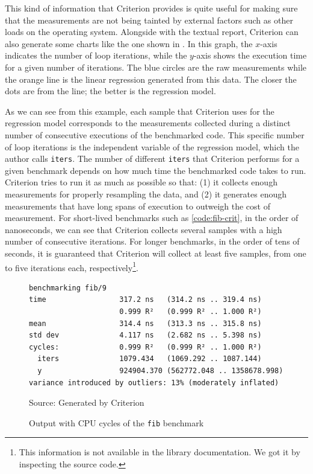 This kind of information that Criterion provides is quite useful for making sure that the measurements are not being tainted by external factors such as other loads on the operating system. Alongside with the textual report, Criterion can also generate some charts like the one shown in . In this graph, the $x$-axis indicates the number of loop iterations, while the $y$-axis shows the execution time for a given number of iterations. The blue circles are the raw measurements while the orange line is the linear regression generated from this data. The closer the dots are from the line; the better is the regression model.

As we can see from this example, each sample that Criterion uses for the regression model corresponds to the measurements collected during a distinct number of consecutive executions of the benchmarked code. This specific number of loop iterations is the independent variable of the regression model, which the author calls \texttt{iters}. The number of different \texttt{iters} that Criterion performs for a given benchmark depends on how much time the benchmarked code takes to run. Criterion tries to run it as much as possible so that: (1) it collects enough measurements for properly resampling the data, and (2) it generates enough measurements that have long spans of execution to outweigh the cost of measurement. For short-lived benchmarks such as \autoref{code:fib-crit}, in the order of nanoseconds, we can see that Criterion collects several samples with a high number of consecutive iterations. For longer benchmarks, in the order of tens of seconds, it is guaranteed that Criterion will collect at least five samples, from one to five iterations each, respectively\footnote{This information is not available in the library documentation. We got it by inspecting the source code.}.

\begin{figure}[htp]
  \centering
  \caption{Output with CPU cycles of the \texttt{fib} benchmark}
  \begin{verbatim}
benchmarking fib/9
time                 317.2 ns   (314.2 ns .. 319.4 ns)
                     0.999 R²   (0.999 R² .. 1.000 R²)
mean                 314.4 ns   (313.3 ns .. 315.8 ns)
std dev              4.117 ns   (2.682 ns .. 5.398 ns)
cycles:              0.999 R²   (0.999 R² .. 1.000 R²)
  iters              1079.434   (1069.292 .. 1087.144)
  y                  924904.370 (562772.048 .. 1358678.998)
variance introduced by outliers: 13% (moderately inflated)
  \end{verbatim}
  \footnotesize{Source: Generated by Criterion}
  \label{fig:fib-cycle-output}
\end{figure}

